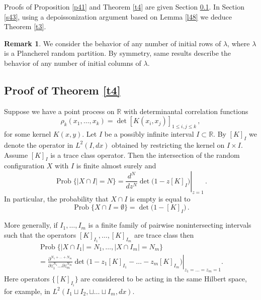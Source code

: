 \documentclass[12pt]{amsart}
\newcommand{\la}{\lambda}
\newcommand{\Prob}{\operatorname{Prob}}
\newcommand{\R}{\mathbb{R}}
\theoremstyle{plain}
\theoremstyle{definition}
\newtheorem{remark}[lemma]{Remark}
\numberwithin{equation}{section}
\begin{document}
Proofs of Proposition \ref{p41} and Theorem \ref{t4} are given Section \ref{s42}.
In Section \ref{s43}, using a depoissonization argument based on Lemma \ref{l48} 
we deduce Theorem \ref{t3}. 

\begin{remark}  We consider the behavior of any number of
initial rows of $\la$, where $\la$
is a Plancherel random partition. By symmetry, same results 
describe the behavior of any number of initial columns of $\la$. 
\end{remark}

\subsection{Proof of Theorem \ref{t4}}\label{s42}

Suppose we have a point process on $\R$ with
determinantal correlation functions 
%
\begin{equation*}
\rho_k(x_1,\dots,x_k)=\det[K(x_i,x_j)]_{1\le i,j \le k}\,,
\end{equation*}
%
for some kernel $K(x,y)$.  Let $I$ be a possibly infinite interval $I\subset\R$. 
By  $[K]_I$ we denote the operator in $L^2(I,dx)$
obtained  by restricting the kernel on $I\times I$. Assume $[K]_I$ is
a trace class operator. Then the intersection of the random configuration
$X$ with $I$ is finite almost surely  and
%
\begin{equation*}
\Prob\{|X\cap I|=N\}=\left.\frac{d^N}{dz^N}\det\Big(1-z[K]_I\Big)\right|_{z=1}\,.
\end{equation*}
%
In particular, the probability that $X\cap I$ is empty is equal to
%
\begin{equation*}
\Prob\{X\cap I=\emptyset\}=\det\Big(1-[K]_I\Big)\,.
\end{equation*}
%

More generally, if $I_1,\dots,I_m$ is a finite family of pairwise
nonintersecting intervals such that the operators
$[K]_{I_1},\dots,[K]_{I_m}$ are trace class then
%
\begin{multline}\label{e41} 
\Prob\{|X\cap I_1|=N_1,\dots,|X\cap I_m|=N_m \}\\
=\left.\frac{\partial^{N_1+\dots+N_m}}
{\partial z_1^{N_1}\dots\partial z_m^{N_m}}
\det\Big(1-z_1[K]_{I_1}-\dots-z_m[K]_{I_m}\Big)\right|_{z_1=\dots=z_m=1}.
\end{multline}
%
Here operators $\{[K]_{I_i}\}$ are considered to be acting in the same Hilbert 
space, for example, in $L^2(I_1\sqcup I_2,\sqcup\dots\sqcup I_m,dx)$.
\end{document}
